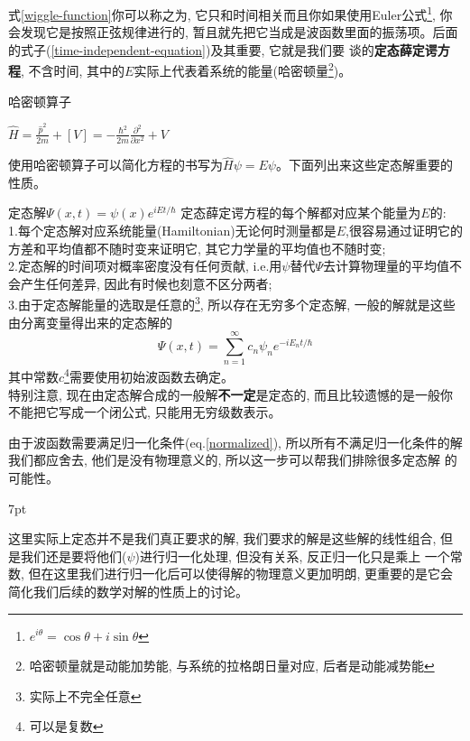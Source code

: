 \documentclass[a4paper,zihao=-4,linespread=1]{ctexrep}
\newenvironment{lequation}{\large\begin{equation}}{\end{equation}}
\newenvironment{thinknote}{%
\def\FrameCommand{%
\hspace{1pt}%
{\color{BurlyWood}\vrule width 2pt}%
{\color{formalshade}\vrule width 4pt}%
\colorbox{formalshade}%
}%
\MakeFramed{\advance\hsize-\width\FrameRestore}%
\noindent\hspace{-4.55pt}%
\begin{adjustwidth}{}{7pt}%
\vspace{2pt}\vspace{2pt}%
}
{%
\vspace{2pt}\end{adjustwidth}\endMakeFramed%
}
\begin{document}
    式\ref{wiggle-function}你可以称之为, 它只和时间相关而且你如果使用Euler公式\footnote[2]{$e^{i\theta}=\cos\theta+i\sin\theta$}, 你
    会发现它是按照正弦规律进行的, 暂且就先把它当成是波函数里面的振荡项。后面的式子(\ref{time-independent-equation})及其重要, 它就是我们要
    谈的\textbf{定态薛定谔方程}, 不含时间, 其中的$E$实际上代表着系统的能量(哈密顿量\footnote[3]{哈密顿量就是动能加势能, 与系统的拉格朗日量对应, 后者是动能减势能})。
    \begin{define}{哈密顿算子}
        \begin{center}
           \begin{math}
            \displaystyle
            \hat{H}=\frac{\hat{p}^2}{2m}+[V]=-\frac{\hbar^2}{2m}\frac{\partial^2}{\partial x^2}+V
        \end{math} 
        \end{center}
    \end{define}
    使用哈密顿算子可以简化方程的书写为$\hat{H}\psi=E\psi$。下面列出来这些定态解重要的性质。
    \begin{theorem}{定态解$\Psi(x,t)=\psi(x)e^{iEt/\hbar}$}
        定态薛定谔方程的每个解都对应某个能量为$E$的:\\
        1.每个定态解对应系统能量(Hamiltonian)无论何时测量都是$E$,很容易通过证明它的方差和平均值都不随时变来证明它, 其它力学量的平均值也不随时变;\\
        2.定态解的时间项对概率密度没有任何贡献, i.e.用$\psi$替代$\Psi$去计算物理量的平均值不会产生任何差异, 因此有时候也刻意不区分两者;\\
        3.由于定态解能量的选取是任意的\footnote{实际上不完全任意}, 所以存在无穷多个定态解, 一般的解就是这些由分离变量得出来的定态解的
        \begin{lequation}
            \label{find_c}
            \boxed{
                \Psi(x,t)=\sum_{n=1}^{\infty}c_n\psi_n e^{-iE_nt/\hbar}
            }
        \end{lequation}
        其中常数$c$\footnote{可以是复数}需要使用初始波函数去确定。\\
        特别注意, 现在由定态解合成的一般解\textbf{不一定}是定态的, 而且比较遗憾的是一般你不能把它写成一个闭公式, 只能用无穷级数表示。
    \end{theorem}
    由于波函数需要满足归一化条件(eq.\ref{normalized}), 所以所有不满足归一化条件的解我们都应舍去, 他们是没有物理意义的, 所以这一步可以帮我们排除很多定态解
    的可能性。
    \begin{thinknote}
        这里实际上定态并不是我们真正要求的解, 我们要求的解是这些解的线性组合, 但是我们还是要将他们($\psi$)进行归一化处理, 但没有关系, 反正归一化只是乘上
        一个常数, 但在这里我们进行归一化后可以使得解的物理意义更加明朗, 更重要的是它会简化我们后续的数学对解的性质上的讨论。
    \end{thinknote}
\end{document}
